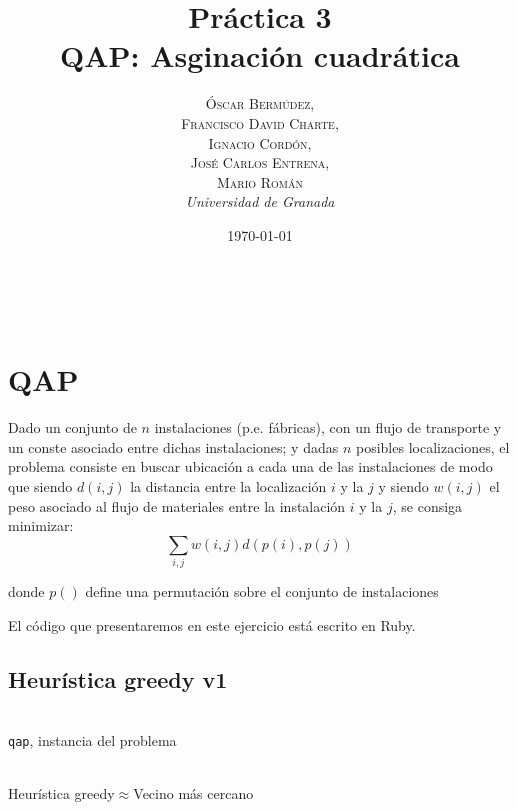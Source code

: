 \documentclass[a4paper, 11pt]{article} %
\title{\textbf{Práctica 3}\\ %
QAP: Asginación cuadrática} %
\author{\textsc{Óscar Bermúdez,\\Francisco David Charte,\\Ignacio Cordón,\\José Carlos Entrena,\\Mario Román} %
\\{\textit{Universidad de Granada}}} %
\date{\today} %
\makeatletter
\renewcommand{\maketitle}{ %
\begin{flushright} %
{\LARGE\@title} %

\vspace{50pt} %

{\large\@author} %
\\\@date %

\vspace{40pt} %
\end{flushright}
}
\makeatother
\begin{document}
\maketitle %

\renewcommand{\abstractname}{Resumen} %
\begin{abstract}
\end{abstract}
{\parskip=2pt
\tableofcontents
}
\pagebreak


\section{QAP}
Dado un conjunto de $n$ instalaciones (p.e. fábricas), con un flujo de transporte y
un conste asociado entre dichas instalaciones; y dadas $n$ posibles localizaciones,
el problema consiste en buscar ubicación a cada una de las instalaciones
de modo que siendo $d(i,j)$ la distancia entre la localización $i$ y la $j$
y siendo $w(i,j)$ el peso asociado al flujo de materiales entre la instalación
$i$ y la $j$, se consiga minimizar:
\begin{equation}
\sum_{i,j} w(i,j) d(p(i),p(j))
\label{coste}
\end{equation}

donde $p()$ define una permutación sobre el conjunto de instalaciones

El código que presentaremos en este ejercicio está escrito en Ruby.
\subsection{Heurística greedy v1}

\begin{algorithm}[H]
	\begin{algorithmic}[1]
		\REQUIRE \ \\
        	\texttt{qap}, instancia del problema \\\
     	\STATE{\texttt{result=qap}}
	    \STATE{\texttt{i=max\_w\_index}}
	  \ENDFOR
	  
	  \ENDIF  
	\ENDFOR
	\end{algorithmic}
    \caption{Heurística greedy$\approx$Vecino más cercano}
    \label{vecino}
\end{algorithm}  
\end{document}
